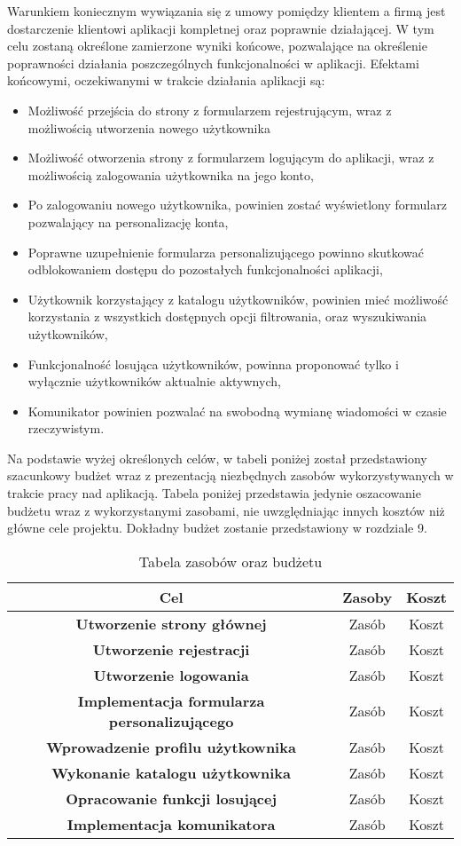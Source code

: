\documentclass[12pt,a4paper]{article}
\begin{document}
Warunkiem koniecznym wywiązania się z umowy pomiędzy klientem a firmą jest dostarczenie klientowi aplikacji kompletnej oraz poprawnie działającej. W tym celu zostaną określone zamierzone wyniki końcowe, pozwalające na określenie poprawności działania poszczególnych funkcjonalności w aplikacji. Efektami końcowymi, oczekiwanymi w trakcie działania aplikacji są: 
\begin{itemize}
    \item Możliwość przejścia do strony z formularzem rejestrującym, wraz z możliwością utworzenia nowego użytkownika
    \item Możliwość otworzenia strony z formularzem logującym do aplikacji, wraz z możliwością zalogowania użytkownika na jego konto,
    \item Po zalogowaniu nowego użytkownika, powinien zostać wyświetlony formularz pozwalający na personalizację konta, 
    \item Poprawne uzupełnienie formularza personalizującego powinno skutkować odblokowaniem dostępu do pozostałych funkcjonalności aplikacji,
    \item Użytkownik korzystający z katalogu użytkowników, powinien mieć możliwość korzystania z wszystkich dostępnych opcji filtrowania, oraz wyszukiwania użytkowników, 
    \item Funkcjonalność losująca użytkowników, powinna proponować tylko i wyłącznie użytkowników aktualnie aktywnych, 
    \item Komunikator powinien pozwalać na swobodną wymianę wiadomości w czasie rzeczywistym.
\end{itemize}

Na podstawie wyżej określonych celów, w tabeli poniżej został przedstawiony szacunkowy budżet wraz z prezentacją niezbędnych zasobów wykorzystywanych w trakcie pracy nad aplikacją. Tabela poniżej przedstawia jedynie oszacowanie budżetu wraz z wykorzystanymi zasobami, nie uwzględniając innych kosztów niż główne cele projektu. Dokładny budżet zostanie przedstawiony w rozdziale 9.

\begin{table}[h!t]
\centering
  \begin{tabular}{c|c|c}
  \hline
  {\bf Cel} & {\bf Zasoby} & {\bf Koszt} \\
  \hline
  \textbf{Utworzenie strony głównej} & Zasób & Koszt\\
  \hline
  \textbf{Utworzenie rejestracji} & Zasób & Koszt\\
  \hline
  \textbf{Utworzenie logowania} & Zasób & Koszt\\
  \hline
  \textbf{Implementacja formularza personalizującego} & Zasób & Koszt\\
  \hline
  \textbf{Wprowadzenie profilu użytkownika} & Zasób & Koszt\\
  \hline
  \textbf{Wykonanie katalogu użytkownika} & Zasób & Koszt\\
  \hline
  \textbf{Opracowanie funkcji losującej} & Zasób & Koszt\\
  \hline
  \textbf{Implementacja komunikatora} & Zasób & Koszt\\
  \hline
  \end{tabular}
\caption{Tabela zasobów oraz budżetu}
\label{tab:zasoby}
\end{table}
\end{document}

